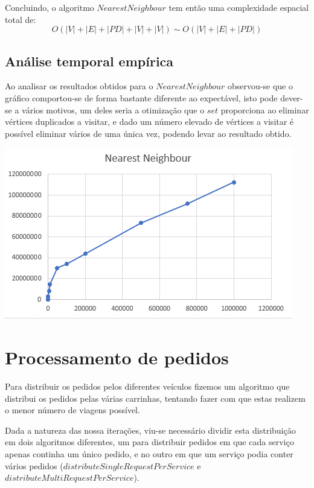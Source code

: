 \documentclass[article, a4paper, 12pt, oneside]{memoir}
\begin{document}
Concluindo, o algoritmo $NearestNeighbour$ tem então uma complexidade espacial total de:
\begin{equation}
O(|V|+|E|+|PD|+|V|+|V|) \sim O(|V|+|E|+|PD|)
\end{equation}

\subsection{Análise temporal empírica}
Ao analisar os resultados obtidos para o $NearestNeighbour$ observou-se que o gráfico comportou-se de forma bastante diferente ao expectável, isto pode dever-se a vários motivos, um deles seria a otimização que o $set$ proporciona ao eliminar vértices duplicados a visitar, e dado um número elevado de vértices a visitar é possível eliminar vários de uma única vez, podendo levar ao resultado obtido.

\begin{center}
\includegraphics[scale=0.5]{nearest_empiric.png}
\end{center}

\section{Processamento de pedidos}
Para distribuir os pedidos pelos diferentes veículos fizemos um algoritmo que distribui os pedidos pelas várias carrinhas,
tentando fazer com que estas realizem o menor número de viagens possível.

Dada a natureza das nossa iterações, viu-se necessário dividir esta distribuição em dois algoritmos diferentes, um para distribuir pedidos em que cada serviço apenas continha um único pedido, e no outro em que um serviço podia conter vários pedidos ($distributeSingleRequestPerService$ e $distributeMultiRequestPerService$).
\end{document}
